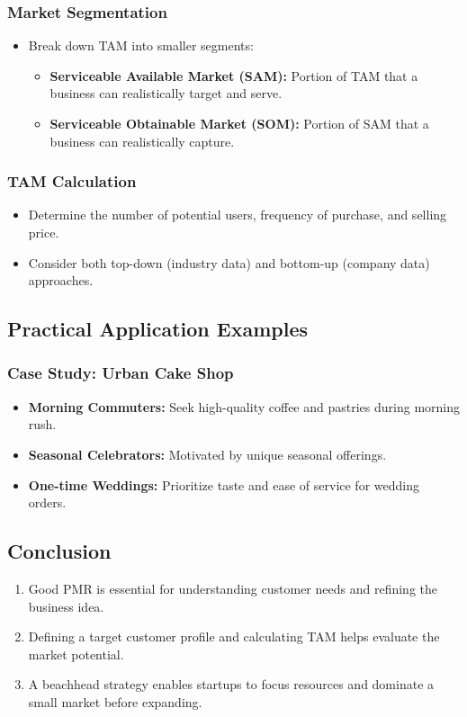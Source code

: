\documentclass[a4paper,11pt]{article}
\begin{document}
\subsubsection{Market Segmentation}
\begin{itemize}
    \item Break down TAM into smaller segments:
    \begin{itemize}
        \item \textbf{Serviceable Available Market (SAM):} Portion of TAM that a business can realistically target and serve.
        \item \textbf{Serviceable Obtainable Market (SOM):} Portion of SAM that a business can realistically capture.
    \end{itemize}
\end{itemize}

\subsubsection{TAM Calculation}
\begin{itemize}
    \item Determine the number of potential users, frequency of purchase, and selling price.
    \item Consider both top-down (industry data) and bottom-up (company data) approaches.
\end{itemize}

\subsection{Practical Application Examples}

\subsubsection{Case Study: Urban Cake Shop}
\begin{itemize}
    \item \textbf{Morning Commuters:} Seek high-quality coffee and pastries during morning rush.
    \item \textbf{Seasonal Celebrators:} Motivated by unique seasonal offerings.
    \item \textbf{One-time Weddings:} Prioritize taste and ease of service for wedding orders.
\end{itemize}

\subsection{Conclusion}
\begin{enumerate}
    \item Good PMR is essential for understanding customer needs and refining the business idea.
    \item Defining a target customer profile and calculating TAM helps evaluate the market potential.
    \item A beachhead strategy enables startups to focus resources and dominate a small market before expanding.
\end{enumerate}
\end{document}
